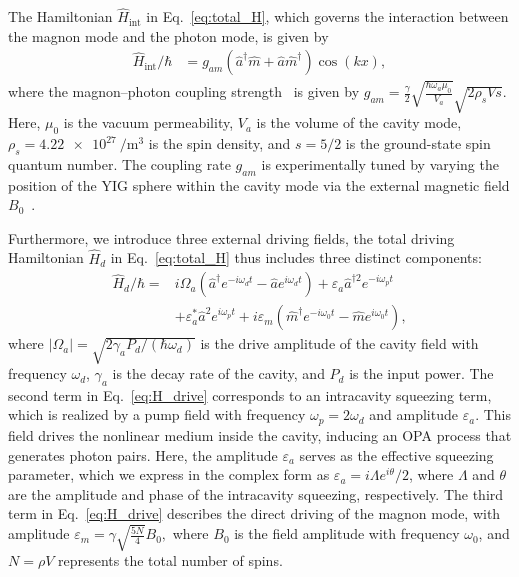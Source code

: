 \documentclass[aps, prresearch, reprint, nofootinbib, longbibliography]{revtex4-2}
\begin{document}
The Hamiltonian $\hat{H}_{\text{int}}$ in Eq.~\eqref{eq:total_H}, which governs the interaction between the magnon mode and the photon mode, is given by
\begin{align}
\hat{H}_{\text{int}}/\hbar &= g_{am} \left( \hat{a}^\dagger \hat{m} + \hat{a} \hat{m}^\dagger \right) \cos(kx), \label{eq:H_int}
\end{align}
where the magnon--photon coupling strength~\cite{PhysRevLett128013602, PhysRevLett.113.156401} is given by $
g_{am} = \frac{\gamma}{2} \sqrt{\frac{\hbar \omega_a \mu_0}{V_a}} \sqrt{2 \rho_s V s}. \label{eq:g_am}
$
Here, $\mu_0$ is the vacuum permeability, $V_a$ is the volume of the cavity mode,  $\rho_s = \SI{4.22e27}{\per\cubic\meter}$  is the spin density, and $s = 5/2$ is the ground-state spin quantum number. The coupling rate $g_{am}$ is experimentally tuned by varying the position of the YIG sphere within the cavity mode via the external magnetic field $B_0$~\cite{PhysRevLett.113.156401}.

Furthermore, we introduce three external driving fields, the total driving Hamiltonian $\hat{H}_d$ in Eq.~\eqref{eq:total_H} thus includes three distinct components:
\begin{align}
	\hat{H}_{d}/\hbar = &i\Omega_{a}\left(\hat{a}^{\dagger} e^{-i\omega_{d} t}-\hat{a} e^{i\omega_{d} t}\right)  + \varepsilon_{a}\hat{a}^{\dagger 2} e^{-i\omega_{p} t} \nonumber \\
	& + {\varepsilon^*_{a}}\hat{a}^{2} e^{i\omega_{p} t} + i\varepsilon_{m}\left(\hat{m}^{\dagger} e^{-i\omega_{0} t}-\hat{m} e^{i\omega_{0} t}\right),
	\label{eq:H_drive}
\end{align}
where $|\Omega_a| = \sqrt{2 \gamma_a P_d/(\hbar \omega_d)}$ is the drive amplitude of the cavity  field with frequency $\omega_d$, $\gamma_a$ is the decay rate of the cavity, and $P_d$ is the input power.
The second term in Eq.~\eqref{eq:H_drive} corresponds to an intracavity squeezing term, which is realized by a pump field with frequency $\omega_p=2\omega_d$ and amplitude $\varepsilon_a$.
This field drives the nonlinear medium inside the cavity, inducing an OPA process that generates photon pairs. 
Here, the amplitude $\varepsilon_a$ serves as the effective squeezing parameter, which we express in the complex form as $\varepsilon_a = i\Lambda e^{i\theta}/2$, where $\Lambda$ and $\theta$ are the amplitude and phase of the intracavity squeezing, respectively.
The third term in Eq.~\eqref{eq:H_drive} describes the direct driving of the magnon mode, with amplitude
$
\varepsilon_m = \gamma \sqrt{\frac{5N }{4}}B_0,
\label{eq:drive_strength}
$
where $B_0$ is the field amplitude with frequency $\omega_0$, and $N = \rho V$ represents the total number of spins.
\end{document}
